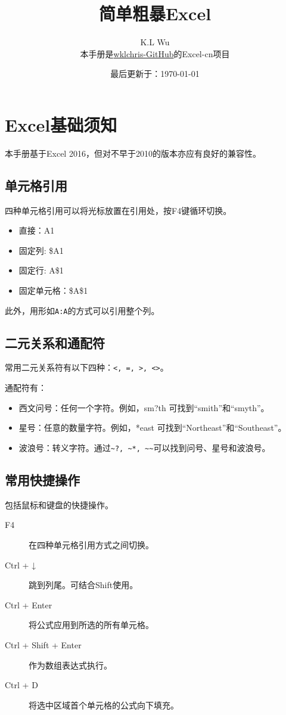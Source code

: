 
\title{简单粗暴Excel}
\author{K.L Wu\\
  {\kaishu 本手册是\href{https://github.com/wklchris/Note-by-LaTeX}{wklchris-GitHub}的Excel-cn项目}
}
\date{最后更新于：\today}


\maketitle

\setlength{\lineskiplimit}{0pt}
\tableofcontents
\setlength{\lineskiplimit}{3pt}

\chapter{Excel基础须知}
本手册基于Excel 2016，但对不早于2010的版本亦应有良好的兼容性。

\section{单元格引用}
四种单元格引用可以将光标放置在引用处，按F4键循环切换。
\begin{itemize}
\item 直接：A1
\item 固定列: \$A1
\item 固定行: A\$1
\item 固定单元格：\$A\$1
\end{itemize}

\vspace*{1ex}此外，用形如\texttt{A:A}的方式可以引用整个列。

\section{二元关系和通配符}
常用二元关系符有以下四种：\verb|<, =, >, <>|。\dpar

通配符有：
\begin{itemize}
\item 西文问号：任何一个字符。例如，sm?th 可找到``smith''和``smyth''。
\item 星号：任意的数量字符。例如，*east 可找到``Northeast''和``Southeast''。
\item 波浪号：转义字符。通过\verb|~?, ~*, ~~|可以找到问号、星号和波浪号。
\end{itemize}

\section{常用快捷操作}
包括鼠标和键盘的快捷操作。
\begin{description}
\item[F4] 在四种单元格引用方式之间切换。
\item[Ctrl + ↓] 跳到列尾。可结合Shift使用。
\item[Ctrl + Enter] 将公式应用到所选的所有单元格。
\item[Ctrl + Shift + Enter] 作为数组表达式执行。
\item[Ctrl + D] 将选中区域首个单元格的公式向下填充。
\end{description}

